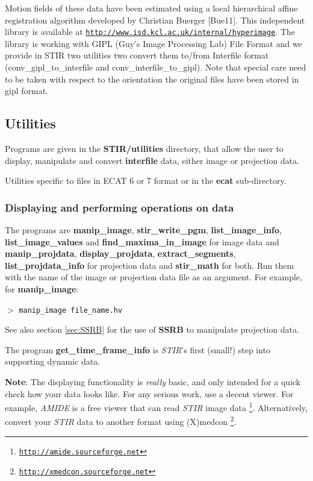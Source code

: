\documentclass{article}
\def\url#1#2{\mbox{\href{#1}{\tt #2}}}
\newcommand{\cmdline}[1]{\par \noindent $>$ \texttt{#1}\par}
\begin{document}
{{{Motion fields of these data have been estimated using a local hierarchical affine
registration algorithm developed by Christian Buerger [Bue11]. This independent
library is available at
\url{http://www.isd.kcl.ac.uk/internal/hyperimage}{http://www.isd.kcl.ac.uk/internal/hyperimage}. 
The library is working with GIPL (Guy's Image Processing Lab) File Format and we provide in STIR two utilities two convert
them to/from Interfile format (conv\_gipl\_to\_interfile and
conv\_interfile\_to\_gipl). Note that special care need to be taken with respect
to the orientation the original files have been stored in gipl format. 


\subsection{
Utilities}

Programs are given in the \textbf{STIR/utilities} directory, that 
allow the user to display, manipulate and convert \textbf{interfile} 
data, either image or projection data.

Utilities specific to files in ECAT 6 or 7 format or in the \textbf{ecat}
sub-directory.

\subsubsection{
Displaying and performing operations on data}

The programs are \textbf{manip\_image}, \textbf{stir\_write\_pgm}, \textbf{list\_image\_info}, 
\textbf{list\_image\_values} and \textbf{find\_maxima\_in\_image}
for image data and \textbf{manip\_projdata}, 
 \textbf{display\_projdata}, \textbf{extract\_segments}, 
\textbf{list\_projdata\_info} for 
projection data and \textbf{stir\_math} for both. Run them with the 
name of the image or projection data file as an argument. For 
example, for \textbf{manip\_image}:
\cmdline{manip\_image file\_name.hv}


See also section \ref{sec:SSRB} for the use of \textbf{SSRB} to manipulate projection 
data.


The program \textbf{get\_time\_frame\_info} is \textit{STIR}'s first (small!) 
step into supporting dynamic data.


\textbf{Note}: The displaying functionality is \textit{really} basic, and 
only intended for a quick check how your data looks like. For 
any serious work, use a decent viewer. For example, \textit{AMIDE} 
is a free viewer that can read \textit{STIR} image data
\footnote{\url{http://amide.sourceforge.net }{http://amide.sourceforge.net}}. Alternatively, 
convert your \textit{STIR} data to another format using (X)medcon
\footnote{\url{http://xmedcon.sourceforge.net }{http://xmedcon.sourceforge.net}}.

}}}
\end{document}
